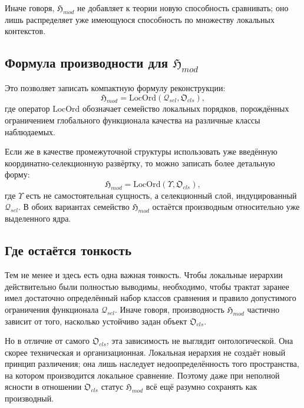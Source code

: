 \documentclass[12pt,a4paper]{article}
\begin{document}
Иначе говоря, \(\mathfrak{H}_{mod}\) не добавляет к теории новую способность сравнивать; оно лишь распределяет уже имеющуюся способность по множеству локальных контекстов.

\subsection{Формула производности для \texorpdfstring{$\mathfrak{H}_{mod}$}{Hmod}}

Это позволяет записать компактную формулу реконструкции:
\begin{equation}
\mathfrak{H}_{mod}=\mathrm{LocOrd}(\mathcal{Q}_{sel},\mathfrak{O}_{cls}),
\end{equation}
где оператор \(\mathrm{LocOrd}\) обозначает семейство локальных порядков, порождённых ограничением глобального функционала качества на различные классы наблюдаемых.

Если же в качестве промежуточной структуры использовать уже введённую координатно-селекционную развёртку, то можно записать более детальную форму:
\begin{equation}
\mathfrak{H}_{mod}=\mathrm{LocOrd}(\Upsilon,\mathfrak{O}_{cls}),
\end{equation}
где \(\Upsilon\) есть не самостоятельная сущность, а селекционный слой, индуцированный \(\mathcal{Q}_{sel}\). В обоих вариантах семейство \(\mathfrak{H}_{mod}\) остаётся производным относительно уже выделенного ядра.

\subsection{Где остаётся тонкость}

Тем не менее и здесь есть одна важная тонкость. Чтобы локальные иерархии действительно были полностью выводимы, необходимо, чтобы трактат заранее имел достаточно определённый набор классов сравнения и правило допустимого ограничения функционала \(\mathcal{Q}_{sel}\). Иначе говоря, производность \(\mathfrak{H}_{mod}\) частично зависит от того, насколько устойчиво задан объект \(\mathfrak{O}_{cls}\).

Но в отличие от самого \(\mathfrak{O}_{cls}\), эта зависимость не выглядит онтологической. Она скорее техническая и организационная. Локальная иерархия не создаёт новый принцип различения; она лишь наследует недоопределённость того пространства, на котором производится локальное сравнение. Поэтому даже при неполной ясности в отношении \(\mathfrak{O}_{cls}\) статус \(\mathfrak{H}_{mod}\) всё ещё разумно сохранять как производный.
\end{document}
